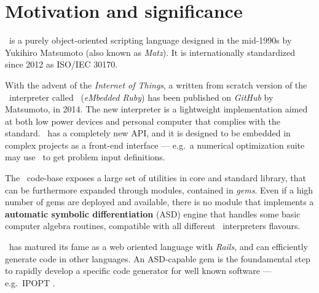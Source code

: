 
\section{Motivation and significance}
\label{sec:motivation}

\Ruby \cite{flanagan2008ruby}~is a purely object-oriented scripting language designed in the mid-1990s by Yukihiro Matsumoto (also known as \emph{Matz}). It is internationally standardized since 2012 as ISO/IEC 30170.

With the advent of the \emph{Internet of Things}, a written from scratch version of the \Ruby~interpreter called \Mruby~(\emph{eMbedded Ruby}) \cite{tanaka2015mruby} has been published on \emph{GitHub} by Matsumoto, in 2014. The new interpreter is a lightweight implementation aimed at both low power devices and personal computer that complies with the standard\cite{iso30170}. \Mruby~has a completely new API, and it is designed to be embedded in complex projects as a front-end interface --- e.g.\ a numerical optimization suite may use \Mruby~to get problem input definitions.

The \Ruby~code-base exposes a large set of utilities in core and standard library, that can be furthermore expanded through modules, contained in \emph{gems}. Even if a high number of gems are deployed and available, there is no module that implements a \textbf{automatic symbolic differentiation} (ASD) \cite{tolsma1998computational} engine that handles some basic computer algebra routines, compatible with all different \Ruby~interpreters flavours.

\Ruby~has matured its fame as a web oriented language with \emph{Rails}, and can efficiently generate code in other languages. An ASD-capable gem is the foundamental step to rapidly develop a specific code generator for well known software --- e.g.\ IPOPT \cite{wachter2009ipopt}\@.

